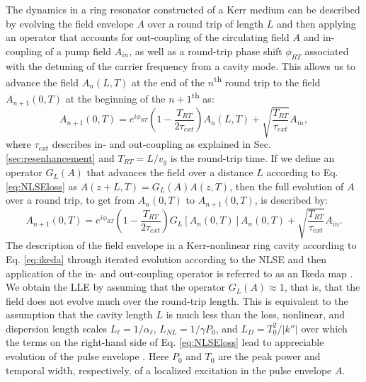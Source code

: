 The dynamics in a ring resonator constructed of a Kerr medium can be described by evolving the field envelope $A$ over a round trip of length $L$ and then applying an operator that accounts for out-coupling of the circulating field $A$ and in-coupling of a pump field $A_{in}$, as well as a round-trip phase shift $\phi_{RT}$ associated with the detuning of the carrier frequency from a cavity mode. This allows us to advance the field $A_n(L,T)$ at the end of the $n$\textsuperscript{th} round trip to the field $A_{n+1}(0,T)$ at the beginning of the $n+1$\textsuperscript{th} as:
\begin{equation}
A_{n+1}(0,T)=e^{i\phi_{RT}}\left(1-\frac{T_{RT}}{2\tau_{ext}}\right)A_n(L,T)+\sqrt{\frac{T_{RT}}{\tau_{ext}}}A_{in},
\end{equation}
where $\tau_{ext}$ describes in- and out-coupling as explained in Sec. \ref{sec:resenhancement} and $T_{RT}=L/v_g$ is the round-trip time. If we define an operator $G_L(A)$ that advances the field over a distance $L$ according to Eq. \ref{eq:NLSEloss} as $A(z+L,T)=G_L(A)A(z,T)$, then the full evolution of $A$ over a round trip, to get from $A_n(0,T)$ to $A_{n+1}(0,T)$, is described by:
\begin{equation}
A_{n+1}(0,T)=e^{i\phi_{RT}}\left(1-\frac{T_{RT}}{2\tau_{ext}}\right)G_L\left[A_n(0,T)\right]A_n(0,T)+\sqrt{\frac{T_{RT}}{\tau_{ext}}}A_{in}. \label{eq:ikeda}
\end{equation}
The description of the field envelope in a Kerr-nonlinear ring cavity according to Eq. \ref{eq:ikeda} through iterated evolution according to the NLSE and then application of the in- and out-coupling operator is referred to as an Ikeda map \cite{Ikeda1979}. We obtain the LLE by assuming that the operator $G_L(A)\approx1$, that is, that the field does not evolve much over the round-trip length. This is equivalent to the assumption that the cavity length $L$ is much less than the loss, nonlinear, and dispersion length scales $L_\ell=1/\alpha_\ell$, $L_{NL}=1/\gamma P_0$, and $L_D=T_0^2/|k''|$ over which the terms on the right-hand side of Eq. \ref{eq:NLSEloss} lead to appreciable evolution of the pulse envelope \cite{Agrawal2007}. Here $P_0$ and $T_0$ are the peak power and temporal width, respectively, of a localized excitation in the pulse envelope $A$.

